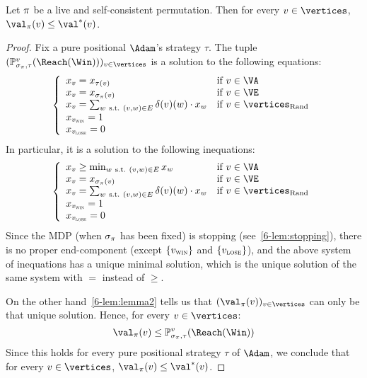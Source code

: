 \begin{lemma}
\label{6-lem:live_self-consistent_lower_bound}
Let $\pi$ be a live and self-consistent permutation.  Then for
every $v \in \vertices$,  $\val_\perm(v) \le \val^*(v)$.
\end{lemma}

\begin{proof}
Fix a pure positional $\Adam$'s strategy $\tau$. The tuple
$(\probm_{\sigma_\perm,\tau}^v(\Reach(\Win)))_{v \in \vertices}$ is
a solution to the following equations:
\[
\left\{\begin{array}{ll} x_v =
  x_{\tau(v)} & \text{if}\ v \in \Adamvertices \\
  x_v = x_{\sigma_\perm(v)} & \text{if}\ v \in \Evevertices \\
  x_v = \sum_{w\ \text{s.t.}\ (v,w) \in E} \delta(v)(w) \cdot
  x_w  & \text{if}\ v \in \Randomvertices \\
  x_{\vwin} = 1 \\
  x_{\vlose} = 0
\end{array}\right.
\]
In particular, it is a solution to the following inequations:
\[
\left\{\begin{array}{ll} 
  x_v \ge \min_{w\ \text{s.t.}\ (v,w) \in E}
  x_w & \text{if}\ v \in \Adamvertices \\
  x_v = x_{\sigma_\perm(v)}  & \text{if}\ v \in \Evevertices \\
  x_v = \sum_{w\ \text{s.t.}\ (v,w) \in E} \delta(v)(w) \cdot x_w
  & \text{if}\ v \in \Randomvertices \\
  x_{\vwin} = 1 \\
  x_{\vlose} = 0
\end{array}\right.
\]
Since the MDP (when $\sigma_\pi$ has been fixed) is stopping (see~\cref{6-lem:stopping}), there is no proper end-component
(except $\{v_{\textsc{win}}\}$ and $\{v_{\textsc{lose}}\}$), and the above system of
inequations has a unique minimal solution, which is the unique
solution of the same system with $=$ instead of $\ge$.

On the other hand~\cref{6-lem:lemma2} tells us that
$(\val_\perm(v))_{v \in\vertices}$ can only be that unique
solution. Hence, for every $v \in \vertices$:
\[
\val_\perm(v) \le \probm_{\sigma_\perm,\tau}^v(\Reach(\Win))
\]
Since this holds for every pure positional strategy $\tau$ of $\Adam$,
we conclude that for every $v \in \vertices$,
$\val_\perm(v) \le \val^*(v)$.
\end{proof}

